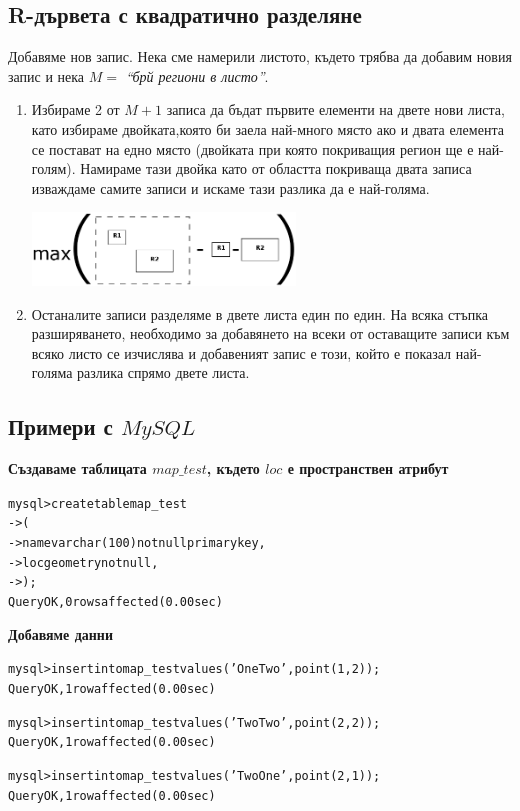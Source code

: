 \documentclass[a4paper,10pt]{article}
\begin{document}
\subsection{R-дървета с квадратично разделяне}
Добавяме нов запис.
Нека сме намерили листото, където трябва да добавим новия запис и 
нека $M = $ \textit{``брй региони в листо''}.
\begin{enumerate}
\item Избираме 2 от $M+1$ записа да бъдат първите елементи на двете нови листа, като избираме двойката,която би заела
най-много място ако и двата елемента се постават на едно място (двойката при която покриващия регион ще е най-голям).
Намираме тази двойка като от областта покриваща двата записа изваждаме самите записи и искаме тази разлика да е най-голяма.
\begin{center}
\includegraphics[width=70mm]{Diagram1.png}\end{center}
\item Останалите записи разделяме в двете листа един по един.
На всяка стъпка разширяването, необходимо за добавянето на всеки от оставащите записи към всяко листо се изчислява
и добавеният запис е този, който е показал най-голяма разлика спрямо двете листа.
\end{enumerate}

\subsection{Примери с $MySQL$}
\textbf{Създаваме таблицата $map\_test$, където $loc$ е пространствен атрибут}
\begin{alltt}
mysql> create table map_test
    -> (
    ->   name varchar(100) not null primary key,
    ->   loc  geometry not null,
    -> );
Query OK, 0 rows affected (0.00 sec)
\end{alltt}

\textbf{Добавяме данни}
\begin{alltt}
mysql> insert into map_test values ('One Two', point(1,2));
Query OK, 1 row affected (0.00 sec)

mysql> insert into map_test values ('Two Two', point(2,2));
Query OK, 1 row affected (0.00 sec)

mysql> insert into map_test values ('Two One', point(2,1));
Query OK, 1 row affected (0.00 sec)
\end{alltt}
\newpage
\end{document}
